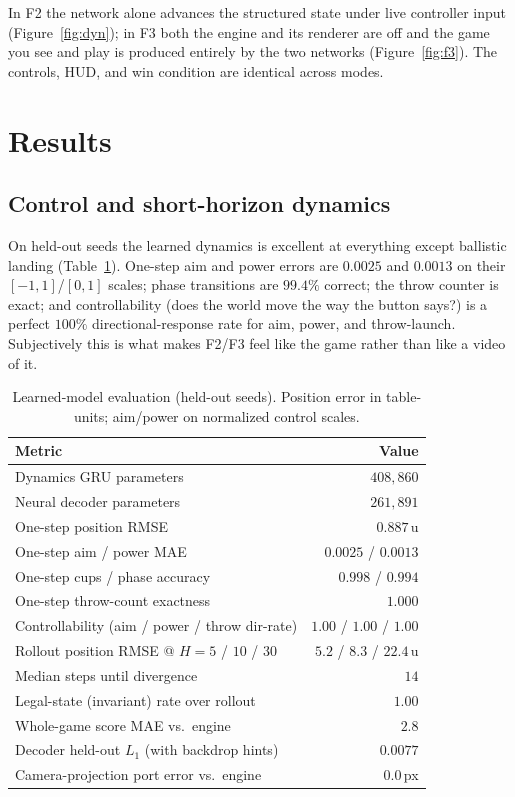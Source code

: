 \documentclass[11pt]{article}
\begin{document}
In F2 the network alone advances the structured state under live controller input (Figure~\ref{fig:dyn}); in F3 both the engine and its renderer are off and the game you see and play is produced entirely by the two networks (Figure~\ref{fig:f3}). The controls, HUD, and win condition are identical across modes.

\section{Results}

\subsection{Control and short-horizon dynamics}

On held-out seeds the learned dynamics is excellent at everything except ballistic landing (Table~\ref{tab:results}). One-step aim and power errors are $0.0025$ and $0.0013$ on their $[-1,1]$/$[0,1]$ scales; phase transitions are $99.4\%$ correct; the throw counter is exact; and controllability (does the world move the way the button says?) is a perfect $100\%$ directional-response rate for aim, power, and throw-launch. Subjectively this is what makes F2/F3 feel like the game rather than like a video of it.

\begin{table}[h!]
\centering
\caption{Learned-model evaluation (held-out seeds). Position error in table-units; aim/power on normalized control scales.}
\label{tab:results}
\begin{tabularx}{\linewidth}{X r}
\toprule
Metric & Value \\
\midrule
Dynamics GRU parameters & $408{,}860$ \\
Neural decoder parameters & $261{,}891$ \\
\midrule
One-step position RMSE & $0.887$\,u \\
One-step aim / power MAE & $0.0025$ / $0.0013$ \\
One-step cups / phase accuracy & $0.998$ / $0.994$ \\
One-step throw-count exactness & $1.000$ \\
Controllability (aim / power / throw dir-rate) & $1.00$ / $1.00$ / $1.00$ \\
\midrule
Rollout position RMSE @ $H{=}5$ / $10$ / $30$ & $5.2$ / $8.3$ / $22.4$\,u \\
Median steps until divergence & $14$ \\
Legal-state (invariant) rate over rollout & $1.00$ \\
Whole-game score MAE vs.\ engine & $2.8$ \\
\midrule
Decoder held-out $L_1$ (with backdrop hints) & $0.0077$ \\
Camera-projection port error vs.\ engine & $0.0$\,px \\
\bottomrule
\end{tabularx}
\end{table}
\end{document}
